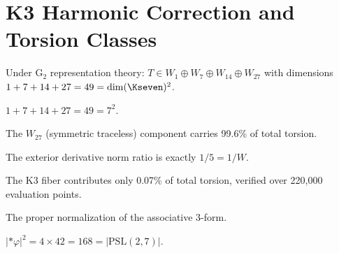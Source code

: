 \section{K3 Harmonic Correction and Torsion Classes}

\begin{definition}\label{def:torsion_classes}
    \leanok
    Under G$_2$ representation theory:
    $T \in W_1 \oplus W_7 \oplus W_{14} \oplus W_{27}$
    with dimensions $1 + 7 + 14 + 27 = 49 = \dim(\Kseven)^2$.
\end{definition}

\begin{theorem}[Torsion Space = $\dim(\Kseven)^2$]\label{thm:torsion_49}
    \leanok
    $1 + 7 + 14 + 27 = 49 = 7^2$.
\end{theorem}

\begin{theorem}\label{thm:tau3_dom}
    \leanok
    The $W_{27}$ (symmetric traceless) component carries 99.6\% of total torsion.
\end{theorem}

\begin{theorem}[$|d\varphi|^2 / |d{*}\varphi|^2 = 1/\text{Weyl}$]\label{thm:dphi_ratio}
    \leanok
    The exterior derivative norm ratio is exactly $1/5 = 1/W$.
\end{theorem}

\begin{theorem}[K3 Contribution $< 0.1\%$]\label{thm:K3_small}
    \leanok
    The K3 fiber contributes only 0.07\% of total torsion,
    verified over 220,000 evaluation points.
\end{theorem}

\begin{theorem}[$|\varphi|^2 = 2b_2 = 42$]\label{thm:phi_sq_42}
    \leanok
    The proper normalization of the associative 3-form.
\end{theorem}

\begin{theorem}[$|{*}\varphi|^2 = |\mathrm{PSL}(2,7)| = 168$]\label{thm:psi_sq_168}
    \leanok
    $|{*}\varphi|^2 = 4 \times 42 = 168 = |\mathrm{PSL}(2,7)|$.
\end{theorem}

